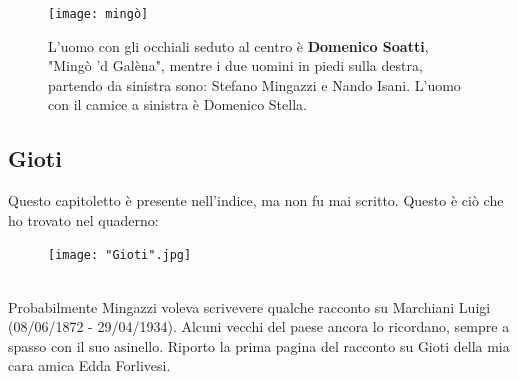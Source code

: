  \begin{figure}[htb]
    \centering
    \texttt{[image: mingò]}
    \caption[Gruppo Montecatini di Alfonsine]{L'uomo con gli occhiali seduto al centro è \textbf{Domenico Soatti}, "Mingò 'd Galèna", mentre i due uomini in piedi sulla destra, partendo da sinistra sono: Stefano Mingazzi e Nando Isani\label{fig:mingò}. L'uomo con il camice a sinistra è Domenico Stella.}
\end{figure}

\newpage
\subsection{Gioti}
Questo capitoletto è presente nell'indice, ma non fu mai scritto. Questo è ciò che ho trovato nel quaderno:\\
\begin{figure}[!htbp]
   \texttt{[image: "Gioti".jpg]}
\end{figure}
\\Probabilmente Mingazzi voleva scrivevere qualche racconto su Marchiani Luigi (08/06/1872 - 29/04/1934). Alcuni vecchi del paese ancora lo ricordano, sempre a spasso con il suo asinello.
\newpage
Riporto la prima pagina del racconto su Gioti della mia cara amica Edda Forlivesi.\\

